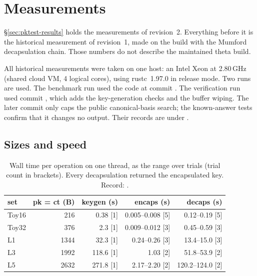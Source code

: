 \section{Measurements}\label{sec:results}

\S\ref{sec:pktest-results} holds the measurements of revision~2. Everything
before it is the historical measurement of revision~1, made on the
 build with the Mumford decapsulation chain. Those
numbers do not describe the maintained theta build.

All historical measurements were taken on one host: an Intel Xeon at 2.80\,GHz (shared
cloud VM, 4 logical cores), using rustc~1.97.0 in release mode. Two runs are
used. The benchmark run  used the code at
commit . The verification run 
used commit , which adds the key-generation checks and the
buffer wiping. The later commit  only caps the public
canonical-basis search; the known-answer tests confirm that it changes no
output. Their records are under
.

\subsection{Sizes and speed}

\begin{table}[h]
\centering
\caption[Wall time per operation on one thread, as the range over trials
(trial count in brackets)]{Wall time per operation on one thread, as the range over trials
(trial count in brackets). Every decapsulation returned the encapsulated key.
Record: .}
\label{tab:timings}
\begin{tabular}{lrrrr}
\toprule
set & pk = ct (B) & keygen (s) & encaps (s) & decaps (s)\\
\midrule
Toy16 & 216 & 0.38 [1] & 0.005--0.008 [5] & 0.12--0.19 [5]\\
Toy32 & 376 & 2.3 [1] & 0.009--0.012 [3] & 0.45--0.59 [3]\\
L1 & 1344 & 32.3 [1] & 0.24--0.26 [3] & 13.4--15.0 [3]\\
L3 & 1992 & 118.6 [1] & 1.03 [2] & 51.8--53.9 [2]\\
L5 & 2632 & 271.8 [1] & 2.17--2.20 [2] & 120.2--124.0 [2]\\
\bottomrule
\end{tabular}
\end{table}

